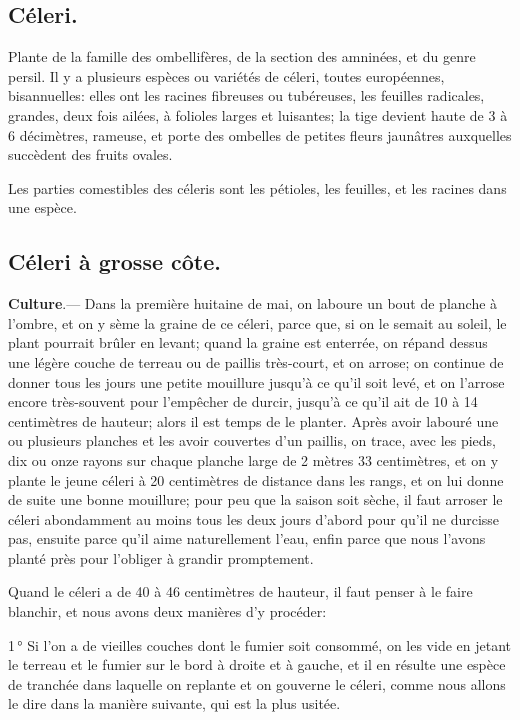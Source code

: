 \documentclass[10pt,a4paper]{book}
\begin{document}
\subsection{Céleri.}

Plante de la famille des ombellifères, de la section des amninées, et du genre persil. Il y a plusieurs espèces ou variétés de céleri, toutes européennes, bisannuelles: elles ont les racines fibreuses ou tubéreuses, les feuilles radicales, grandes, deux fois ailées, à folioles larges et luisantes; la tige devient haute de 3 à 6 décimètres, rameuse, et porte des ombelles de petites fleurs jaunâtres auxquelles succèdent des fruits ovales.

Les parties comestibles des céleris sont les pétioles, les feuilles, et les racines dans une espèce.

\subsection{Céleri à grosse côte.}

\textbf{Culture}.--- Dans la première huitaine de mai, on laboure un bout de planche à l'ombre, et on y sème la graine de ce céleri, parce que, si on le semait au soleil, le plant pourrait brûler en levant; quand la graine est enterrée, on répand dessus une légère couche de terreau ou de paillis très-court, et on arrose; on continue de donner tous les jours une petite mouillure jusqu'à ce qu'il soit levé, et on l'arrose encore très-souvent pour l'empêcher de durcir, jusqu'à ce qu'il ait de 10 à 14 centimètres de hauteur; alors il est temps de le planter. Après avoir labouré une ou plusieurs planches et les avoir couvertes d'un paillis, on trace, avec les pieds, dix ou onze rayons sur chaque planche large de 2 mètres 33 centimètres, et on y plante le jeune céleri à 20 centimètres de distance dans les rangs, et on lui donne de suite une bonne mouillure; pour peu que la saison soit sèche, il faut arroser le céleri abondamment au moins tous les deux jours d'abord pour qu'il ne durcisse pas, ensuite parce qu'il aime naturellement l'eau, enfin parce que nous l'avons planté près pour l'obliger à grandir promptement.

Quand le céleri a de 40 à 46 centimètres de hauteur, il faut penser à le faire blanchir, et nous avons deux manières d'y procéder:

1\,° Si l'on a de vieilles couches dont le fumier soit consommé, on les vide en jetant le terreau et le fumier sur le bord à droite et à gauche, et il en résulte une espèce de tranchée dans laquelle on replante et on gouverne le céleri, comme nous allons le dire dans la manière suivante, qui est la plus usitée.
\end{document}
